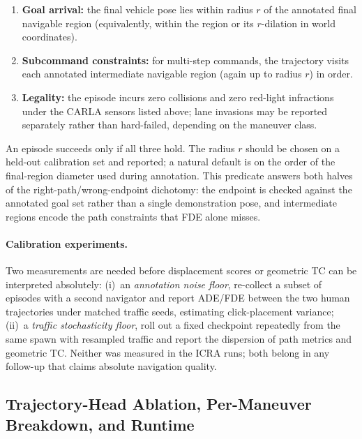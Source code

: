 \begin{enumerate}
    \item \textbf{Goal arrival:} the final vehicle pose lies within radius $r$ of the annotated final navigable region (equivalently, within the region or its $r$-dilation in world coordinates).
    \item \textbf{Subcommand constraints:} for multi-step commands, the trajectory visits each annotated intermediate navigable region (again up to radius $r$) in order.
    \item \textbf{Legality:} the episode incurs zero collisions and zero red-light infractions under the CARLA sensors listed above; lane invasions may be reported separately rather than hard-failed, depending on the maneuver class.
\end{enumerate}

An episode succeeds only if all three hold. The radius $r$ should be chosen on a held-out calibration set and reported; a natural default is on the order of the final-region diameter used during annotation. This predicate answers both halves of the right-path/wrong-endpoint dichotomy: the endpoint is checked against the annotated goal set rather than a single demonstration pose, and intermediate regions encode the path constraints that FDE alone misses.

\paragraph{Calibration experiments.}
Two measurements are needed before displacement scores or geometric TC can be interpreted absolutely: (i)~an \emph{annotation noise floor}, re-collect a subset of episodes with a second navigator and report ADE/FDE between the two human trajectories under matched traffic seeds, estimating click-placement variance; (ii)~a \emph{traffic stochasticity floor}, roll out a fixed checkpoint repeatedly from the same spawn with resampled traffic and report the dispersion of path metrics and geometric TC. Neither was measured in the ICRA runs; both belong in any follow-up that claims absolute navigation quality.

\subsection{Trajectory-Head Ablation, Per-Maneuver Breakdown, and Runtime}


